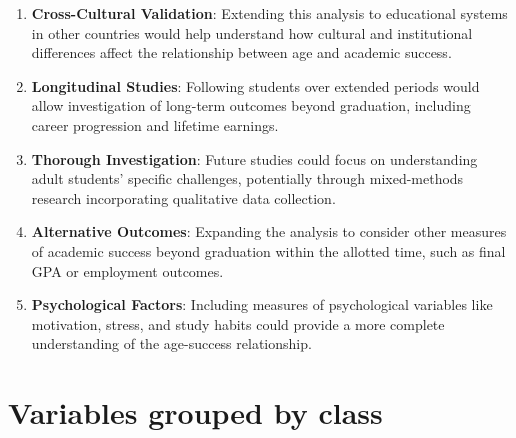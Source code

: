 \documentclass{article}
\begin{document}
\begin{enumerate}
    \item \textbf{Cross-Cultural Validation}: Extending this analysis to educational systems in other countries would help understand how cultural and institutional differences affect the relationship between age and academic success.

    \item \textbf{Longitudinal Studies}: Following students over extended periods would allow investigation of long-term outcomes beyond graduation, including career progression and lifetime earnings.

    \item \textbf{Thorough Investigation}: Future studies could focus on understanding adult students' specific challenges, potentially through mixed-methods research incorporating qualitative data collection.

    \item \textbf{Alternative Outcomes}: Expanding the analysis to consider other measures of academic success beyond graduation within the allotted time, such as final GPA or employment outcomes.
    
    \item \textbf{Psychological Factors}: Including measures of psychological variables like motivation, stress, and study habits could provide a more complete understanding of the age-success relationship.
\end{enumerate}




\appendix

\newpage
\section{Variables grouped by class}
\end{document}
